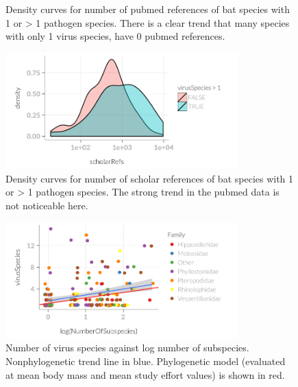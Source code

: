 \begin{knitrout}
\begin{figure}[t]
{}

\caption[Density of number of pubmed references 1 or >1 viruses.]{Density curves for number of pubmed references of bat species with 1 or > 1 pathogen species.
There is a clear trend that many species with only 1 virus species, have 0 pubmed references.
}\label{fig:rm1vir}
\end{figure}

\begin{figure}[t]

{\centering \includegraphics[width=0.8\textwidth]{figure/rm1vir-4} 

}

\caption[Density of number of scholar references 1 or >1 viruses.]{Density curves for number of scholar references of bat species with 1 or > 1 pathogen species.
The strong trend in the pubmed data is not noticeable here.
}\label{fig:rm1vir}
\end{figure}


\end{knitrout}

\clearpage
\begin{knitrout}\footnotesize
{}\color{fgcolor}\begin{figure}[t]

{\centering \includegraphics[width=0.8\textwidth]{figure/plotSubspecies-1} 

}

\caption[Number of virus species against log number of subspecies]{Number of virus species against log number of subspecies. Nonphylogenetic trend line in blue. Phylogenetic model (evaluated at mean body mass and mean study effort values) is shown in red.}\label{fig:plotSubspecies}
\end{figure}


\end{knitrout}





